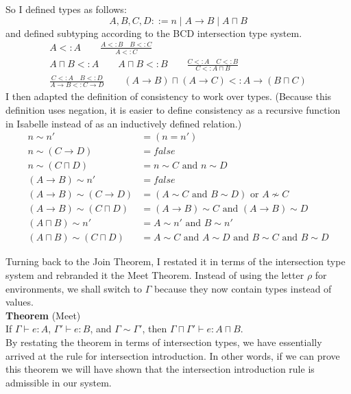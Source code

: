 \documentclass{article}
\begin{document}
So I defined types as follows:
\[
  A,B,C,D ::= n \mid A \to B \mid A \sqcap B
\]
and defined subtyping according to the BCD intersection type system.
\begin{gather*}
A <: A \qquad \frac{A <: B \quad B <: C}{A <: C} \\[2ex]
A \sqcap B <: A \qquad
A \sqcap B <: B \qquad
\frac{C <: A \quad C <: B}{C <: A \sqcap B} \\[2ex]
\frac{C <: A \quad B <: D}{A \to B <: C \to D}
\qquad
(A\to B) \sqcap (A \to C) <: A \to (B \sqcap C)
\end{gather*}
I then adapted the definition of consistency to work over types.
(Because this definition uses negation, it is easier to define
consistency as a recursive function in Isabelle instead of as an
inductively defined relation.)
\begin{align*}
 n \sim n' &= (n = n') \\
 n \sim (C \to D) &= \mathit{false} \\
 n \sim (C \sqcap D) &= n \sim C \text{ and } n \sim D \\
 (A \to B) \sim n' &= \mathit{false} \\
 (A \to B) \sim (C \to D) &= 
    (A \sim C \text{ and } B \sim D) \text{ or } A \not\sim C \\
 (A \to B) \sim (C \sqcap D) &=
    (A \to B) \sim C \text{ and } (A \to B) \sim D \\
 (A \sqcap B) \sim n' &= A \sim n' \text{ and } B \sim n' \\
 (A \sqcap B) \sim (C \sqcap D) &= 
    A \sim C \text{ and } A \sim D \text{ and } 
    B \sim C \text{ and } B \sim D
\end{align*}

Turning back to the Join Theorem, I restated it in terms of the
intersection type system and rebranded it the Meet Theorem. Instead of
using the letter $\rho$ for environments, we shall switch to $\Gamma$
because they now contain types instead of values. \\

\noindent \textbf{Theorem} (Meet)\\
  If $\Gamma \vdash e : A$, $\Gamma' \vdash e : B$, and $\Gamma \sim
  \Gamma'$, 
  then $\Gamma\sqcap\Gamma' \vdash e : A \sqcap B$. \\

By restating the theorem in terms of intersection types, we have
essentially arrived at the rule for intersection introduction.  In
other words, if we can prove this theorem we will have shown that the
intersection introduction rule is admissible in our system.
\end{document}
